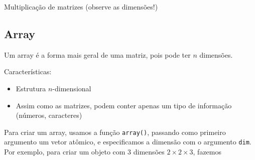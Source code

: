 \documentclass[10pt,a4paper]{book}
\newenvironment{Shaded}{\begin{snugshade}}{\end{snugshade}}
\newcommand{\KeywordTok}[1]{\textcolor[rgb]{0.13,0.29,0.53}{\textbf{#1}}}
\newcommand{\DataTypeTok}[1]{\textcolor[rgb]{0.13,0.29,0.53}{#1}}
\newcommand{\DecValTok}[1]{\textcolor[rgb]{0.00,0.00,0.81}{#1}}
\newcommand{\StringTok}[1]{\textcolor[rgb]{0.31,0.60,0.02}{#1}}
\newcommand{\OperatorTok}[1]{\textcolor[rgb]{0.81,0.36,0.00}{\textbf{#1}}}
\newcommand{\NormalTok}[1]{#1}
\providecommand{\tightlist}{%
  \setlength{\itemsep}{0pt}\setlength{\parskip}{0pt}}
\begin{document}
Multiplicação de matrizes (observe as dimensões!)

\begin{Shaded}
\end{Shaded}

\subsection{Array}\label{array}

Um array é a forma mais geral de uma matriz, pois pode ter \(n\)
dimensões.

Características:

\begin{itemize}
\tightlist
\item
  Estrutura \(n\)-dimensional
\item
  Assim como as matrizes, podem conter apenas um tipo de informação
  (números, caracteres)
\end{itemize}

Para criar um array, usamos a função \texttt{array()}, passando como
primeiro argumento um vetor atômico, e especificamos a dimensão com o
argumento \texttt{dim}. Por exemplo, para criar um objeto com 3
dimensões \(2 \times 2 \times 3\), fazemos
\end{document}

